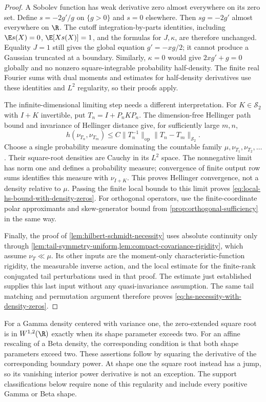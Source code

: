 \begin{proof}
A Sobolev function has weak derivative zero almost everywhere on its
zero set.
Define \(s=-2g'/g\) on \(\{g>0\}\) and \(s=0\) elsewhere.
Then \(sg=-2g'\) almost everywhere on \(\R\).
The cutoff integration-by-parts identities, including
\(\E s(X)=0\), \(\E[Xs(X)]=1\), and the formulas for \(J,\kappa\), are
therefore unchanged.
Equality \(J=1\) still gives the global equation \(g'=-xg/2\);
it cannot produce a Gaussian truncated at a boundary.
Similarly, \(\kappa=0\) would give \(2xg'+g=0\) globally and no
nonzero square-integrable probability half-density.
The finite real Fourier sums with dual moments and estimates for half-density
derivatives use
these identities and \(L^2\) regularity, so their proofs apply.

The infinite-dimensional limiting step needs a different interpretation.
For \(K\in\mathcal S_2\) with \(I+K\) invertible, put
\(T_n=I+P_nKP_n\).
The dimension-free Hellinger path bound and invariance of Hellinger distance
give, for sufficiently large \(m,n\),
\[
 h(\nu_{T_n},\nu_{T_m})
 \leq C\|T_n^{-1}\|_{\mathrm{op}}
                 \|T_n-T_m\|_{\mathcal S_2}.
\]
Choose a single probability measure dominating the countable family
\(\mu,\nu_{T_1},\nu_{T_2},\ldots\).
Their square-root densities are Cauchy in its \(L^2\) space.
The nonnegative limit has norm one and defines a probability measure;
convergence of finite output row sums identifies this measure with
\(\nu_{I+K}\).
This proves Hellinger convergence, not a density relative to \(\mu\).
Passing the finite local bounds to this limit proves
\eqref{eq:local-hs-bound-with-density-zeros}.
For orthogonal operators, use the finite-coordinate polar
approximants and skew-generator bound from
\cref{prop:orthogonal-sufficiency} in the same way.

Finally, the proof of \cref{lem:hilbert-schmidt-necessity} uses absolute
continuity only through
\cref{lem:tail-symmetry-uniform,lem:compact-covariance-rigidity},
which assume \(\nu_T\ll\mu\).
Its other inputs are the moment-only characteristic-function rigidity,
the measurable inverse action, and the local estimate for the finite-rank
conjugated tail perturbations used in that proof.
The estimate just established supplies this last input without any
quasi-invariance assumption.
The same tail matching and permutation argument therefore proves
\eqref{eq:hs-necessity-with-density-zeros}.
\end{proof}

For a Gamma density centered with variance one, the zero-extended square root is in
\(W^{1,2}(\R)\) exactly when its shape parameter exceeds two.
For an affine rescaling of a Beta density, the corresponding condition is
that both shape parameters exceed two.
These assertions follow by squaring the derivative of the corresponding
boundary power.
At shape one the square root instead has a jump, so its vanishing
interior power derivative is not an exception.
The support classifications below require none of this regularity
and include every positive Gamma or Beta shape.

